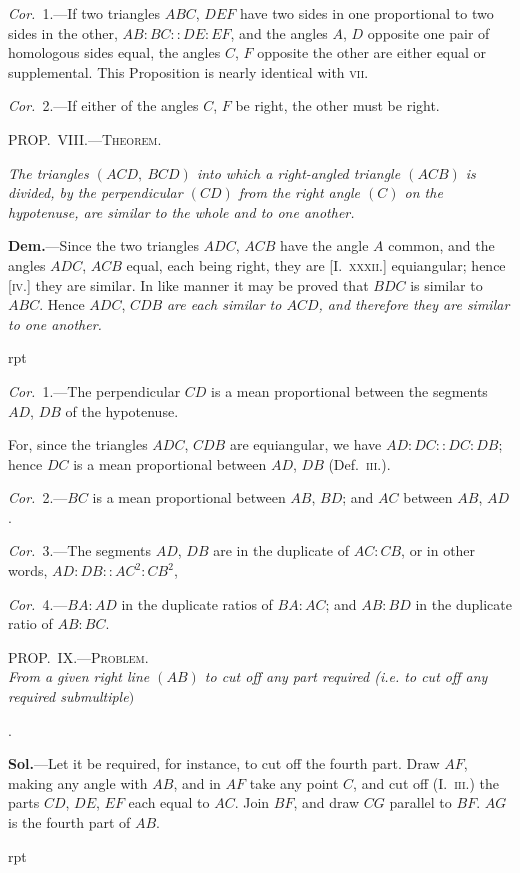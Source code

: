 \documentclass[oneside]{book}
\newcommand\myprop[2]{
\bigskip\Needspace*{4\baselineskip}\begin{center}\textsc{#1}\\\medskip\emph{#2}\par\end{center}
}
\newcommand\mypropl[2]{
\bigskip\Needspace*{4\baselineskip}\begin{center}\textsc{#1}\end{center}
\hspace{\parindent}\emph{#2}\par\medskip
}
\newcommand\imgflow[3]{
\setcounter{wrapwidth}{#1}
\begin{wrapfigure}[#2]{r}{\value{wrapwidth}pt}
\begin{center}
\vspace{-0.3in}
\end{center}
\end{wrapfigure}
}
\begin{document}
\emph{Cor.}~1.---If two triangles $ABC$, $DEF$ have two sides
in one proportional to two sides in the other, $AB:BC
::DE:EF$, and the angles $A$, $D$ opposite one pair of
homologous sides equal, the angles $C$, $F$ opposite the
other are either equal or supplemental. This Proposition
is nearly identical with \textsc{vii.}

\emph{Cor.}~2.---If either of the angles $C$, $F$ be right, the
other must be right.

\mypropl{PROP\@.~VIII\@.---Theorem.}{The triangles $(ACD,\ BCD)$ into which a right-angled
triangle $(ACB)$ is divided, by the perpendicular $(CD)$ from
the right angle $(C)$ on the hypotenuse, are similar to the
whole and to one another.}


\textbf{Dem.}---Since the two triangles $ADC$, $ACB$ have the
angle $A$ common, and the angles
$ADC$, $ACB$ equal, each being
right, they are [I.~\textsc{xxxii.}] equiangular;
hence [\textsc{iv}.] they are
similar. In like manner it may
be proved that $BDC$ is similar
to $ABC$. Hence $ADC$, $CDB$ \textit{are
each similar to $ACD$, and therefore they are similar to one
another.}

\imgflow{110}{6}{f176}

\emph{Cor.}~1.---The perpendicular $CD$ is a mean proportional
between the segments $AD$, $DB$ of the hypotenuse.

For, since the triangles $ADC$, $CDB$ are equiangular,
we have $AD:DC::DC:DB$; hence $DC$ is a mean
proportional between $AD$, $DB$ (Def.~\textsc{iii.}).

\emph{Cor.}~2.---$BC$ is a mean proportional between $AB$,
$BD$; and $AC$ between $AB$, $AD$.

\emph{Cor.}~3.---The segments $AD$, $DB$ are in the duplicate
of $AC:CB$, or in other words, $AD:DB::AC^2:CB^2$,

\emph{Cor.}~4.---$BA:AD$ in the duplicate ratios of $BA:AC$;
and $AB:BD$ in the duplicate ratio of $AB:BC$.

\myprop{PROP\@.~IX\@.---Problem.}{From a given right line $(AB)$ to cut off any part required
\textrm{(i.e.} to cut off any required submultiple$)$}.

\textbf{Sol.}---Let it be required, for instance, to cut off the
fourth part. Draw $AF$, making any angle with $AB$,
and in $AF$ take any point $C$, and cut off (I.~\textsc{iii.}) the
parts $CD$, $DE$, $EF$ each equal to $AC$. Join $BF$, and
draw $CG$ parallel to $BF$. $AG$ is the fourth part of
$AB$.


\imgflow{115}{6}{f177}
\end{document}

